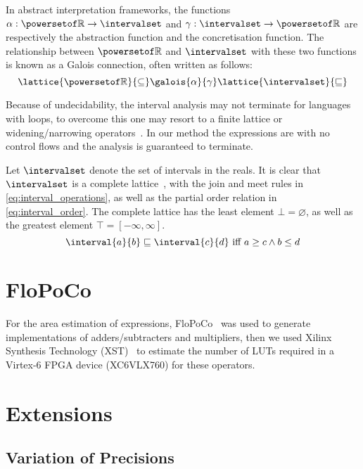In abstract interpretation frameworks, the functions $\alpha:
\powersetof\realset \to \intervalset$ and $\gamma: \intervalset \to
\powersetof\realset$ are respectively the abstraction function and the
concretisation function. The relationship between $\powersetof\realset$ and
$\intervalset$ with these two functions is known as a Galois connection, often
written as follows:
\begin{equation}
    \lattice{\powersetof\realset}{\subseteq}
    \galois{\alpha}{\gamma}
    \lattice{\intervalset}{\sqsubseteq}
\end{equation}

Because of undecidability, the interval analysis may not terminate for
languages with loops, to overcome this one may resort to a finite lattice or
widening/narrowing operators~\cite{basic_absint}. In our method the expressions
are with no control flows and the analysis is guaranteed to terminate.

Let $\intervalset$ denote the set of intervals in the reals. It is clear that
$\intervalset$ is a complete lattice~\cite{nielson}, with the join and meet
rules in \eqref{eq:interval_operations}, as well as the partial order relation
in \eqref{eq:interval_order}. The complete lattice has the least element $\bot
= \varnothing$, as well as the greatest element $\top = \left[ -\infty, \infty
\right]$.
\begin{equation}
    \interval{a}{b} \sqsubseteq \interval{c}{d}
    \text{~iff~}
    a \geq c \wedge b \leq d
    \label{eq:interval_order}
\end{equation}

\section{FloPoCo}

For the area estimation of expressions, FloPoCo~\cite{flopoco} was used to
generate implementations of adders/subtracters and multipliers, then we used
Xilinx Synthesis Technology (XST)~\cite{xst} to estimate the number of LUTs
required in a Virtex-6 FPGA device (XC6VLX760) for these operators.


\section{Extensions}
\label{sub:extensions}

\subsection{Variation of Precisions}

